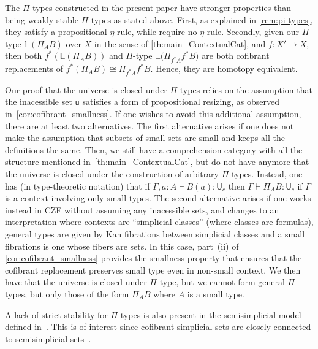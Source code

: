 \documentclass[reqno,10pt,a4paper,oneside,draft]{amsart}
\numberwithin{equation}{section}
\theoremstyle{mythm}
\theoremstyle{mydef}
\theoremstyle{myrmk}
\newcommand{\co}{\colon}
\newcommand{\U}{\mathsf{U}}
\begin{document}
\begin{remark}
The $\Pi$-types constructed in the present paper have stronger properties than being weakly stable $\Pi$-types as stated above. First, as explained in \cref{rem:pi-types}, they satisfy a propositional $\eta$-rule, while \cite{LumsdaineP:locuoc} require no $\eta$-rule. Secondly, given our $\Pi$-type $\mathbb{L}(\Pi_A B)$ over $X$ in the sense of \cref{th:main_ContextualCat}, and $f \co X'  \rightarrow X$, then  both $f^*( \mathbb{L} ( \Pi_A B ))$ and $\Pi$-type $\mathbb{L} \big( \Pi_{f^* A} f^* B \big)$ are both cofibrant replacements of $f^* (\Pi_A B) \cong \Pi_{f^*A} f^* B $. Hence, they are homotopy equivalent. 
\end{remark}


\begin{remark} \label{rem:strength}
Our proof that the universe is closed under $\Pi$-types relies on the assumption that the inacessible set $\mathsf{u}$ satisfies a form of propositional resizing, as observed in~\cref{cor:cofibrant_smallness}. If one wishes to avoid this additional assumption, there are at least two alternatives.
The first alternative arises if one does not make the assumption that subsets of small sets are small and keeps all the definitions the same. Then, we still have a comprehension category with all the structure mentioned in~\cref{th:main_ContextualCat}, but do not have anymore that the universe is closed under the construction of arbitrary $\Pi$-types. Instead, one has (in type-theoretic notation) that if  $\Gamma, a \co A \vdash B(a) \co \U_c$ then $\Gamma \vdash \Pi_A B \co \U_c$ if $\Gamma$ is a context  involving only small types. The second alternative arises if one works instead in CZF without assuming any inacessible sets, and changes to an interpretation where contexts are ``simplicial classes'' (where classes are formulas), general types are given by Kan fibrations between simplicial classes and a small fibrations is one whose fibers are sets. In this case, part~(ii) of \cref{cor:cofibrant_smallness}  provides the smallness property that ensures that the cofibrant replacement preserves small type even in non-small context.  We then   have that the universe is closed under $\Pi$-type, but we cannot form general  $\Pi$-types, but only those of the form $\Pi_A B$ where $A$ is a small type.
\end{remark}


\begin{remark} A lack of strict stability for $\Pi$-types is also present in the semisimplicial
model defined in~\cite{CoquandT:gentgi}. This is of interest since cofibrant simplicial
sets are closely connected to semisimplicial sets~\cite{henry2019qms}. 
\end{remark} 
\end{document}
